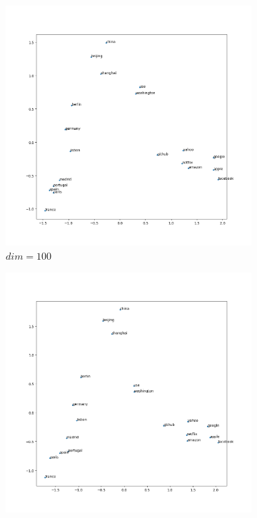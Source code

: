 \documentclass[12pt,a4paper]{article}
\begin{document}
	\begin{figure}[H]
		\centering
		\begin{subfigure}[H]{0.32\textwidth}
			\centering
			\includegraphics[width=\textwidth]{Figures/visual_100}
			\caption{$dim=100$}
		\end{subfigure}
		\begin{subfigure}[H]{0.32\textwidth}
			\centering
			\includegraphics[width=\textwidth]{Figures/visual_200}

\end{subfigure}
\end{figure}
\end{document}
